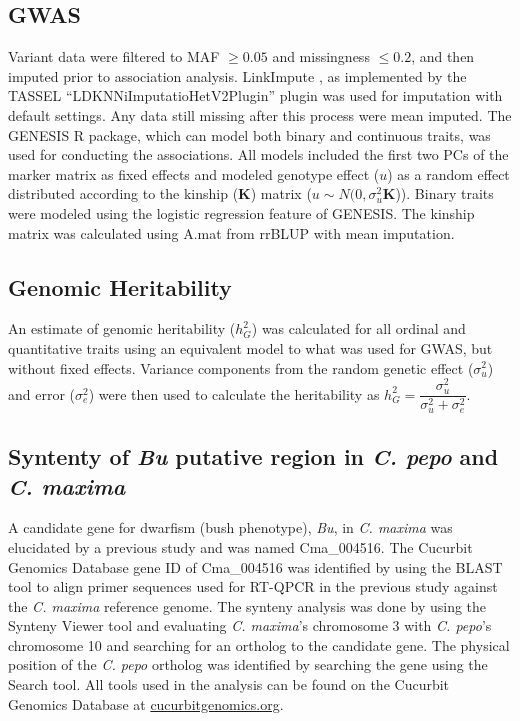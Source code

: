 \documentclass[utf8]{FrontiersinHarvard} %
\begin{document}
\subsection{GWAS}
Variant data were filtered to MAF $\geq 0.05$  and missingness $\leq 0.2$, and then imputed prior to association analysis. LinkImpute \citep{Money2015}, as implemented by the TASSEL \citep{Bradbury2007} “LDKNNiImputatioHetV2Plugin” plugin was used for imputation with default settings. Any data still missing after this process were mean imputed. The GENESIS \citep{Gogarten2019} R package, which can model both binary and continuous traits, was used for conducting the associations. All models included the first two PCs of the marker matrix as fixed effects and modeled genotype effect ($u$) as a random effect distributed according to the kinship ($\mathbf{K}$) matrix ($u \sim N(0,\sigma_{u}^{2}\textbf{K}$)). Binary traits were modeled using the logistic regression feature of GENESIS. The kinship matrix was calculated using A.mat from rrBLUP \citep{Endelman2011} with mean imputation.

\subsection{Genomic Heritability}

An estimate of genomic heritability ($h_{G}^{2}$) \citep{Campos2015} was calculated for all ordinal and quantitative traits using an equivalent model to what was used for GWAS, but without fixed effects. Variance components from the random genetic effect ($\sigma_{u}^{2}$) and error ($\sigma_{e}^{2}$) were then used to calculate the heritability as $h_{G}^{2} = \dfrac{\sigma_{u}^{2}}{\sigma_{u}^{2} + \sigma_{e}^{2}}$.

\subsection{Syntenty of \textit{Bu} putative region in \textit{C. pepo} and \textit{C. maxima}}
 A candidate gene for dwarfism (bush phenotype), \textit{Bu}, in \textit{C. maxima} was elucidated by a previous study \citep{Zhang2015} and was named Cma\_004516. The Cucurbit Genomics Database gene ID of Cma\_004516 was identified by using the BLAST tool to align primer sequences used for RT-QPCR in the previous study against the \textit{C. maxima} reference genome. The synteny analysis was done by using the Synteny Viewer tool and evaluating \textit{C. maxima}’s chromosome 3 with \textit{C. pepo}’s chromosome 10 and searching for an ortholog to the candidate gene. The physical position of the \textit{C. pepo} ortholog was identified by searching the gene using the Search tool. All tools used in the analysis can be found on the Cucurbit Genomics Database at \href{https://www.cucurbitgenomics.org}{cucurbitgenomics.org}.
\end{document}
